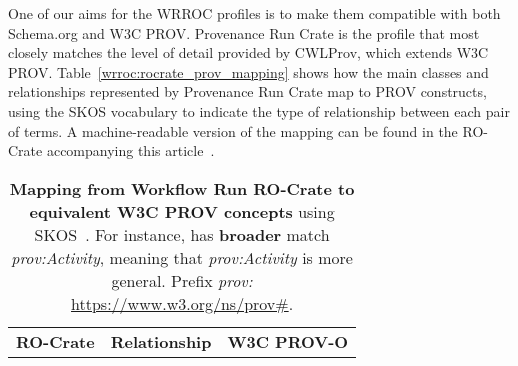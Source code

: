 One of our aims for the WRROC profiles is to make them compatible with both Schema.org and W3C PROV. Provenance Run Crate is the profile that most closely matches the level of detail provided by CWLProv, which extends W3C PROV. Table~\ref{wrroc:rocrate_prov_mapping} shows how the main classes and relationships represented by Provenance Run Crate map to PROV constructs, using the SKOS vocabulary to indicate the type of relationship between each pair of terms. A machine-readable version of the mapping can be found in the RO-Crate accompanying this article~\cite{wrroc-crate,wrroc-crate-html}.

\begin{table}[h]
  \centering
  \caption{
  {\bf Mapping from Workflow Run RO-Crate to equivalent W3C PROV concepts} using SKOS~\cite{Isaac 2009}. For instance,  has \textbf{broader} match \emph{prov:Activity}, meaning that \emph{prov:Activity} is more general. Prefix \emph{prov:} \url{https://www.w3.org/ns/prov\#}.}
  \begin{tabular}{p{60mm}|p{40mm}|p{40mm}}
  \hline
  {\bf RO-Crate} & \textbf{Relationship} & {\bf W3C PROV-O} \\


\end{tabular}
\end{table}
